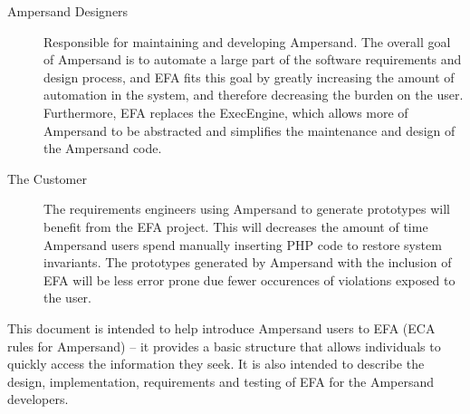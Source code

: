 \begin{description}
	\item[Ampersand Designers] Responsible for maintaining and developing Ampersand. The overall goal of Ampersand 
is to automate a large part of the software requirements and design process, and EFA fits this goal by greatly increasing
the amount of automation in the system, and therefore decreasing the burden on the user. Furthermore, EFA replaces the ExecEngine,
which allows more of Ampersand to be abstracted and simplifies the maintenance and design of the Ampersand code. 
	\item[The Customer] The requirements engineers using Ampersand to generate prototypes will benefit from the EFA project. 
This will decreases the amount of time 
Ampersand users spend manually inserting PHP code to restore system invariants. The prototypes generated by Ampersand with the 
inclusion of EFA will be less error prone due fewer occurences of violations exposed to the user.
\end{description}

This document is intended to help introduce Ampersand users to EFA 
(ECA rules for Ampersand) -- it provides a basic structure that allows 
individuals to quickly access the information they seek. It is also 
intended to describe the design, implementation, requirements and testing
of EFA for the Ampersand developers. 
